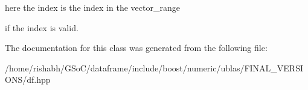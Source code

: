 here the index is the index in the vector\+\_\+range 

if the index is valid. 

The documentation for this class was generated from the following file\+:\begin{DoxyCompactItemize}
\item 
/home/rishabh/\+G\+So\+C/dataframe/include/boost/numeric/ublas/\+F\+I\+N\+A\+L\+\_\+\+V\+E\+R\+S\+I\+O\+N\+S/df.\+hpp\end{DoxyCompactItemize}

